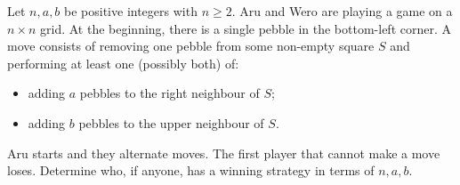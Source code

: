 Let $n,a,b$ be positive integers with $n \geq 2$.
Aru and Wero are playing a game on a $n\times n$ grid.
At the beginning, there is a single pebble in the bottom-left corner.
A move consists of removing one pebble from some non-empty square $S$ and
performing at least one (possibly both) of:
\begin{itemize}
    \item adding $a$ pebbles to the right neighbour of $S$;
    \item adding $b$ pebbles to the upper neighbour of $S$.
\end{itemize}
Aru starts and they alternate moves.
The first player that cannot make a move loses.
Determine who, if anyone, has a winning strategy in terms of $n, a, b$.
